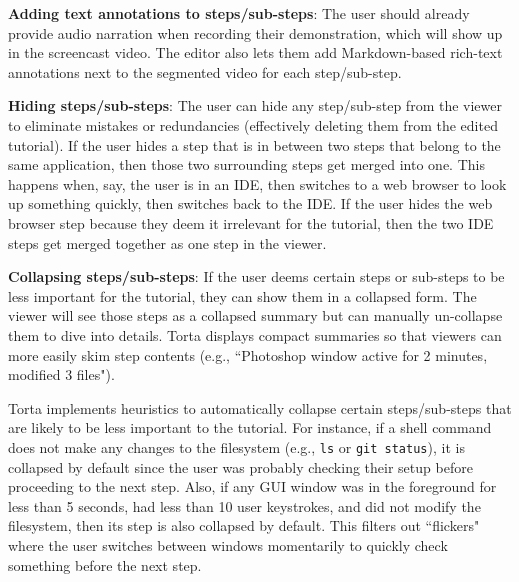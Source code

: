 \textbf{Adding text annotations to steps/sub-steps}: The user
should already provide audio narration when recording their
demonstration, which will show up in the screencast video. The editor
also lets them add Markdown-based rich-text annotations next to the segmented video for
each step/sub-step.
%

\textbf{Hiding steps/sub-steps}: The user can hide any step/sub-step
from the viewer to eliminate mistakes or redundancies (effectively
deleting them from the edited tutorial). If the user hides a step that
is in between two steps that belong to the same application, then those
two surrounding steps get merged into one. This happens when, say, the
user is in an IDE, then switches to a web browser to look up something
quickly, then switches back to the IDE. If the user hides the web
browser step because they deem it irrelevant for the tutorial, then the
two IDE steps get merged together as one step in the viewer.
%


\textbf{Collapsing steps/sub-steps}: If the user deems certain steps or
sub-steps to be less important for the tutorial, they can show them in a
collapsed form. The viewer will see those steps as a collapsed summary
but can manually un-collapse them to dive into details. Torta displays
compact summaries so that viewers can more easily skim step contents
(e.g., ``Photoshop window active for 2 minutes, modified 3 files").

Torta implements heuristics to automatically collapse certain
steps/sub-steps that are likely to be less important to the tutorial.
For instance, if a shell command does not make any changes to the
filesystem (e.g., {\small \texttt{ls}} or {\small \texttt{git status}}),
it is collapsed by default since the user was probably checking their
setup before proceeding to the next step. Also, if any GUI window was in
the foreground for less than 5 seconds, had less than 10 user
keystrokes, and did not modify the filesystem, then its step is also
collapsed by default. This filters out ``flickers" where the user
switches between windows momentarily to quickly check something before
the next step.
%

